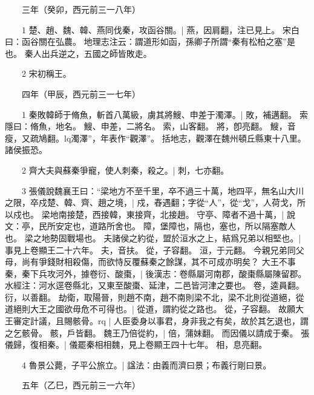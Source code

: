 　　三年（癸卯，西元前三一八年）

　　1 楚、趙、魏、韓、燕同伐秦，攻函谷關。|{
	燕，因肩翻，注已見上。
	宋白曰：函谷關在弘農。
	地理志注云：謂道形如函，孫卿子所謂“秦有松柏之塞”是也。
}
秦人出兵逆之，五國之師皆敗走。


　　2 宋初稱王。


　　四年（甲辰，西元前三一七年）

　　1 秦敗韓師于脩魚，斬首八萬級，虜其將䱸、申差于濁澤。|{
	敗，補邁翻。
	索隱曰：脩魚，地名。
	䱸、申差，二將名。
	索，山客翻。
	將，卽亮翻。
	䱸，音瘦，又疏鳩翻。lq濁澤”，年表作“觀澤”。
	括地志，觀澤在魏州頓丘縣東十八里。
}
諸侯振恐。


　　2 齊大夫與蘇秦爭寵，使人刺秦，殺之。|{
	刺，七亦翻。
}

　　3 張儀說魏襄王曰：“梁地方不至千里，卒不過三十萬，地四平，無名山大川之限，卒戍楚、韓、齊、趙之境，|{
	戍，舂遇翻；字從“人”，從“戈”，人荷戈，所以戍也。
	梁地南接楚，西接韓，東接齊，北接趙。
}
守亭、障者不過十萬，|{
	說文：亭，民所安定也，道路所舍也。
	障，堡障也，隔也，塞也，所以隔塞敵人也。
}
梁之地勢固戰場也。
	夫諸侯之約從，盟於洹水之上，結爲兄弟以相堅也。|{
	事見上卷顯王二十六年。
	夫，音扶。
	從，子容翻。
	洹，于元翻。
}
今親兄弟同父母，尚有爭錢財相殺傷，而欲恃反覆蘇秦之餘謀，其不可成亦明矣？
大王不事秦，秦下兵攻河外，據卷衍、酸棗，|{
	後漢志：卷縣屬河南郡，酸棗縣屬陳留郡。
	水經注：河水逕卷縣北，又東至酸棗、延津，二邑皆河津之要也。
	卷，逵員翻。
	衍，以善翻。
}
劫衛，取陽晉，則趙不南，趙不南則梁不北，梁不北則從道絕，從道絕則大王之國欲毋危不可得也。|{
	從道，謂約從之路也。
	從，子容翻。
}
故願大王審定計議，且賜骸骨。rq |{
	人臣委身以事君，身非我之有矣，故於其乞退也，謂之乞骸骨。
	骸，戶皆翻。
}
魏王乃倍從約，|{
	倍，蒲妹翻。
}
而因儀以請成于秦。
	張儀歸，復相秦。|{
	儀罷秦相相魏，見上卷顯王四十七年。
	相，息亮翻。
}

　　4 魯景公薨，子平公旅立。|{
	諡法：由義而濟曰景；布義行剛曰景。
}

　　五年（乙巳，西元前三一六年）

